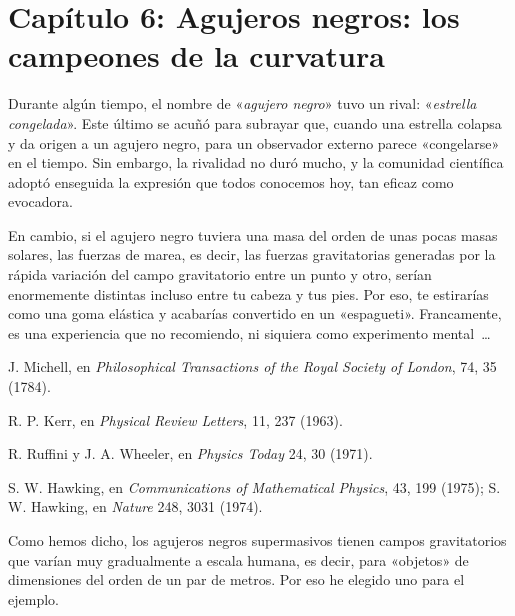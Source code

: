 \section*{Capítulo 6: Agujeros negros: los campeones de la curvatura}
\begin{description}[style=multiline,leftmargin=2em,labelwidth=1.5em]

\item[1.]\hypertarget{note:06-01}{}Durante algún tiempo, el nombre de «\emph{agujero negro}» tuvo un rival: «\emph{estrella congelada}». Este último se acuñó para subrayar que, cuando una estrella colapsa y da origen a un agujero negro, para un observador externo parece «congelarse» en el tiempo. Sin embargo, la rivalidad no duró mucho, y la comunidad científica adoptó enseguida la expresión que todos conocemos hoy, tan eficaz como evocadora.

\item[2.]\hypertarget{note:06-02}{}En cambio, si el agujero negro tuviera una masa del orden de unas pocas masas solares, las fuerzas de marea, es decir, las fuerzas gravitatorias generadas por la rápida variación del campo gravitatorio entre un punto y otro, serían enormemente distintas incluso entre tu cabeza y tus pies. Por eso, te estirarías como una goma elástica y acabarías convertido en un «espagueti». Francamente, es una experiencia que no recomiendo, ni siquiera como experimento mental~\ldots{}

\item[3.]\hypertarget{note:06-03}{}J. Michell, en \emph{Philosophical Transactions of the Royal Society of London}, 74, 35 (1784).

\item[4.]\hypertarget{note:06-04}{}R. P. Kerr, en \emph{Physical Review Letters}, 11, 237 (1963).

\item[5.]\hypertarget{note:06-05}{}R. Ruffini y J. A. Wheeler, en \emph{Physics Today} 24, 30 (1971).

\item[6.]\hypertarget{note:06-06}{}S. W. Hawking, en \emph{Communications of Mathematical Physics}, 43, 199 (1975); S. W. Hawking, en \emph{Nature} 248, 3031 (1974).

\item[7.]\hypertarget{note:06-07}{}Como hemos dicho, los agujeros negros supermasivos tienen campos gravitatorios que varían muy gradualmente a escala humana, es decir, para «objetos» de dimensiones del orden de un par de metros. Por eso he elegido uno para el ejemplo.


\end{description}
